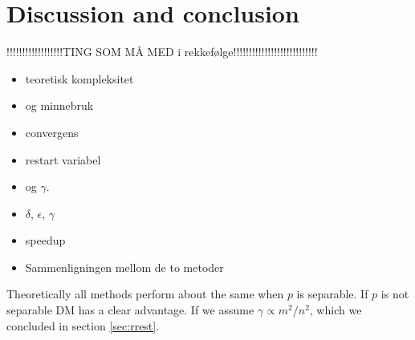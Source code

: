\chapter{Discussion and conclusion}%
!!!!!!!!!!!!!!!!!!TING SOM MÅ MED i rekkefølge!!!!!!!!!!!!!!!!!!!!!!!!!!!\\
\begin{itemize}
\item teoretisk kompleksitet
\item og minnebruk
\item convergens
\item restart variabel
\item og $\gamma$.
\item $\delta$, $\epsilon$, $\gamma$
\item speedup
\item Sammenligningen mellom de to metoder
\end{itemize}

Theoretically all methods perform about the same when $p$ is separable. If $p$ is not separable DM has a clear advantage. If we assume $\gamma \propto m^2/n^2$, which we concluded in section \ref{sec:rrest}.







